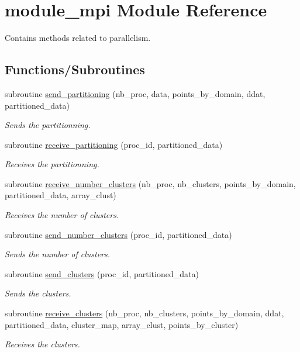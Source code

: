 \hypertarget{namespacemodule__mpi}{}\section{module\+\_\+mpi Module Reference}
\label{namespacemodule__mpi}


Contains methods related to parallelism.  


\subsection*{Functions/\+Subroutines}
\begin{DoxyCompactItemize}
\item 
subroutine \hyperlink{namespacemodule__mpi_a8f29a8b24f027344c03e639dc747e849}{send\+\_\+partitioning} (nb\+\_\+proc, data, points\+\_\+by\+\_\+domain, ddat, partitioned\+\_\+data)
\begin{DoxyCompactList}\small\item\em Sends the partitionning. \end{DoxyCompactList}\item 
subroutine \hyperlink{namespacemodule__mpi_a2066496a812a1babe9ad15d90d01feea}{receive\+\_\+partitioning} (proc\+\_\+id, partitioned\+\_\+data)
\begin{DoxyCompactList}\small\item\em Receives the partitionning. \end{DoxyCompactList}\item 
subroutine \hyperlink{namespacemodule__mpi_a62be40b2a3129f7c49677cc68eba40e8}{receive\+\_\+number\+\_\+clusters} (nb\+\_\+proc, nb\+\_\+clusters, points\+\_\+by\+\_\+domain, partitioned\+\_\+data, array\+\_\+clust)
\begin{DoxyCompactList}\small\item\em Receives the number of clusters. \end{DoxyCompactList}\item 
subroutine \hyperlink{namespacemodule__mpi_a5254902c6427631ec28067e9c88481f3}{send\+\_\+number\+\_\+clusters} (proc\+\_\+id, partitioned\+\_\+data)
\begin{DoxyCompactList}\small\item\em Sends the number of clusters. \end{DoxyCompactList}\item 
subroutine \hyperlink{namespacemodule__mpi_a0e866540092c31b9cd5fb527cda5714e}{send\+\_\+clusters} (proc\+\_\+id, partitioned\+\_\+data)
\begin{DoxyCompactList}\small\item\em Sends the clusters. \end{DoxyCompactList}\item 
subroutine \hyperlink{namespacemodule__mpi_ac81a5a711ffecf500db9dd0d05bedd29}{receive\+\_\+clusters} (nb\+\_\+proc, nb\+\_\+clusters, points\+\_\+by\+\_\+domain, ddat, partitioned\+\_\+data, cluster\+\_\+map, array\+\_\+clust, points\+\_\+by\+\_\+cluster)
\begin{DoxyCompactList}\small\item\em Receives the clusters. \end{DoxyCompactList}\end{DoxyCompactItemize}
